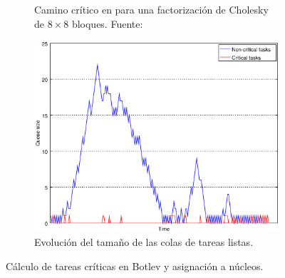 \begin{figure}
  \centering
  
  \begin{subfigure}{.44\textwidth}
    \centering
    \setlength{\fboxsep}{5pt}
    \caption[Camino crítico en \botlev para una factorización de Cholesky de
      $8\times8$ bloques]{Camino crítico en \botlev para una factorización de Cholesky de
      $8\times8$ bloques. Fuente:~\cite{botlev}}
    \label{s3:fig:botlev_tdg}
  \end{subfigure}
  \begin{subfigure}{.55\textwidth}
    \centering
    \includegraphics[width=1\linewidth]{Figures/botlev-colas.eps}
    \caption{Evolución del tamaño de las colas de tareas
      listas.}
    \label{s3:fig:botlev_colas}
  \end{subfigure}  
  
  \caption{Cálculo de tareas críticas en Botlev y asignación a núcleos.}
  \label{s3:fig:botlev}
\end{figure}

